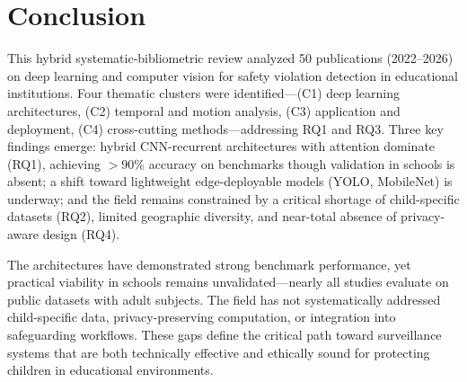 \documentclass[conference]{IEEEtran}
\begin{document}
\section{Conclusion}

This hybrid systematic-bibliometric review analyzed 50 publications (2022--2026) on deep learning and computer vision for safety violation detection in educational institutions. Four thematic clusters were identified---(C1) deep learning architectures, (C2) temporal and motion analysis, (C3) application and deployment, (C4) cross-cutting methods---addressing RQ1 and RQ3. Three key findings emerge: hybrid CNN-recurrent architectures with attention dominate (RQ1), achieving $>$90\% accuracy on benchmarks though validation in schools is absent; a shift toward lightweight edge-deployable models (YOLO, MobileNet) is underway; and the field remains constrained by a critical shortage of child-specific datasets (RQ2), limited geographic diversity, and near-total absence of privacy-aware design (RQ4).

The architectures have demonstrated strong benchmark performance, yet practical viability in schools remains unvalidated---nearly all studies evaluate on public datasets with adult subjects. The field has not systematically addressed child-specific data, privacy-preserving computation, or integration into safeguarding workflows. These gaps define the critical path toward surveillance systems that are both technically effective and ethically sound for protecting children in educational environments.
\end{document}
